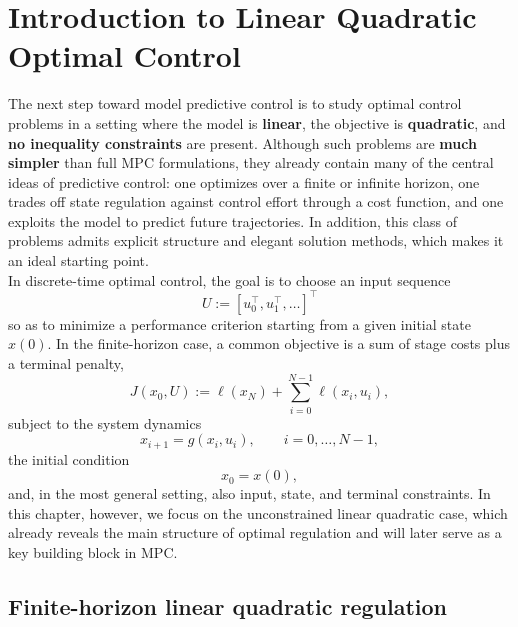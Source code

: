\section{Introduction to Linear Quadratic Optimal Control}

The next step toward model predictive control is to study optimal control problems in a setting where the model is \textbf{linear}, the objective is \textbf{quadratic}, and \textbf{no inequality constraints} are present. Although such problems are \textbf{much simpler} than full MPC formulations, they already contain many of the central ideas of predictive control: one optimizes over a finite or infinite horizon, one trades off state regulation against control effort through a cost function, and one exploits the model to predict future trajectories. In addition, this class of problems admits explicit structure and elegant solution methods, which makes it an ideal starting point.\\

In discrete-time optimal control, the goal is to choose an input sequence
\[
U := [u_0^\top,u_1^\top,\dots]^\top
\]
so as to minimize a performance criterion starting from a given initial state $x(0)$. In the finite-horizon case, a common objective is a sum of stage costs plus a terminal penalty,
\[
J(x_0,U) := \ell(x_N) + \sum_{i=0}^{N-1} \ell(x_i,u_i),
\]
subject to the system dynamics
\[
x_{i+1}=g(x_i,u_i), \qquad i=0,\dots,N-1,
\]
the initial condition
\[
x_0=x(0),
\]
and, in the most general setting, also input, state, and terminal constraints. In this chapter, however, we focus on the unconstrained linear quadratic case, which already reveals the main structure of optimal regulation and will later serve as a key building block in MPC.

\subsection{Finite-horizon linear quadratic regulation}

